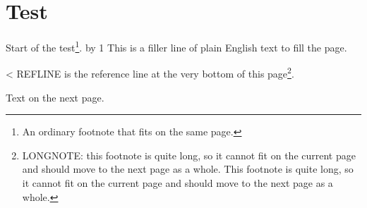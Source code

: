 \documentclass{ujbook}
\begin{document}
\chapter{Test}
Start of the test\footnote{An ordinary footnote that fits on the same page.}.
\newcount\mycount {}
\loop
  \advance\mycount by 1
  This is a filler line of plain English text to fill the page.\par
\ifnum\mycount<\FILLN \repeat
REFLINE is the reference line at the very bottom of this page\footnote{LONGNOTE: this footnote is quite long, so it cannot fit on the current page and should move to the next page as a whole. This footnote is quite long, so it cannot fit on the current page and should move to the next page as a whole.}.

Text on the next page.
\end{document}
